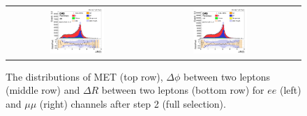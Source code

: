 \begin{figure}[ht]
\begin{center}
\begin{tabular}{ccc}
      \includegraphics[width=0.4\textwidth]{figures/tW/fig/Step2/ee/H_ll_DR.png}&
      \includegraphics[width=0.4\textwidth]{figures/tW/fig/Step2/mumu/H_ll_DR.png}\\
    \end{tabular}
    \caption{The distributions of MET (top row), $\Delta\phi$ between two leptons (middle row) and $\Delta R$ between two leptons (bottom row) for $ee$ (left) and $\mu\mu$ (right) channels after step 2 (full selection).
    \label{fig:step2_MET_phi_Dphi_DR}}
  \end{center}
\end{figure}

